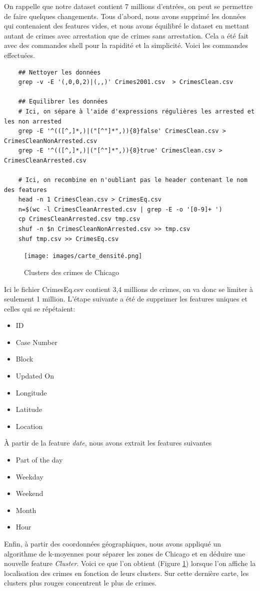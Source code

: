\documentclass{article}
\begin{document}
    On rappelle que notre dataset contient 7 millions d'entrées, on peut se permettre
    de faire quelques changements.
    Tous d'abord, nous avons supprimé les données qui contenaient des features vides,
    et nous avons équilibré le dataset en mettant autant de crimes avec arrestation que de crimes sans arrestation.
    Cela a été fait avec des commandes shell pour la rapidité et la simplicité. 
    Voici les commandes effectuées.

    \begin{Verbatim}
    ## Nettoyer les données
    grep -v -E '(,0,0,2)|(,,)' Crimes2001.csv  > CrimesClean.csv
    
    ## Equilibrer les données
    # Ici, on sépare à l'aide d'expressions régulières les arrested et les non arrested
    grep -E '^(([^,]*,)|("[^"]*",)){8}false' CrimesClean.csv > CrimesCleanNonArrested.csv
    grep -E '^(([^,]*,)|("[^"]*",)){8}true' CrimesClean.csv > CrimesCleanArrested.csv
 
    # Ici, on recombine en n'oubliant pas le header contenant le nom des features
    head -n 1 CrimesClean.csv > CrimesEq.csv
    n=$(wc -l CrimesCleanArrested.csv | grep -E -o '[0-9]+ ')
    cp CrimesCleanArrested.csv tmp.csv
    shuf -n $n CrimesCleanNonArrested.csv >> tmp.csv
    shuf tmp.csv >> CrimesEq.csv
    \end{Verbatim}

    \begin{figure}
	    \centering
	    \texttt{[image: images/carte\_densité.png]}
	    \caption{Clusters des crimes de Chicago}
	    \label{E}
    \end{figure}
    Ici le fichier CrimesEq.csv contient 3,4 millions de crimes, on va donc se limiter à seulement 1 million. 
    L'étape suivante a été de supprimer les features uniques et celles qui se répétaient:
    \begin{itemize}
	    \item ID
	    \item Case Number
	    \item Block
	    \item Updated On
	    \item Longitude
	    \item Latitude
	    \item Location
    \end{itemize}
    À partir de la feature \textit{date}, nous avons extrait les features suivantes
    \begin{itemize}
	    \item Part of the day
	    \item Weekday
	    \item Weekend
	    \item Month
	    \item Hour
    \end{itemize}
    Enfin, à partir des coordonnées géographiques, nous avons appliqué un algorithme
    de k-moyennes pour séparer les zones de Chicago et en déduire une nouvelle
    feature \textit{Cluster}. 
    Voici ce que l'on obtient (Figure \ref{E}) lorsque l'on affiche la localisation des crimes en
    fonction de leurs clusters.
    Sur cette dernière carte, les clusters plus rouges concentrent le plus de crimes.
\end{document}

